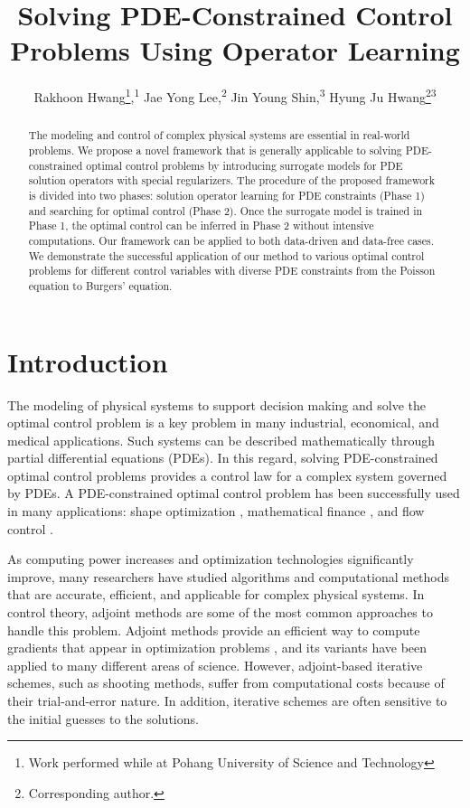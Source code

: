 \documentclass[letterpaper]{article}
\title{Solving PDE-Constrained Control Problems Using Operator Learning}
\author{
    Rakhoon Hwang\equalcontrib\thanks{Work performed while at Pohang University of Science and
Technology},\textsuperscript{\rm 1}
    Jae Yong Lee\equalcontrib\footnotemark[2],\textsuperscript{\rm 2}
    Jin Young Shin\equalcontrib,\textsuperscript{\rm 3}
    Hyung Ju Hwang\thanks{Corresponding author.}\textsuperscript{\rm 3}
}
\begin{document}
\maketitle

\begin{abstract}
The modeling and control of complex physical systems are essential in real-world problems. We propose a novel framework that is generally applicable to solving PDE-constrained optimal control problems by introducing surrogate models for PDE solution operators with special regularizers. The procedure of the proposed framework is divided into two phases: solution operator learning for PDE constraints (Phase 1) and searching for optimal control (Phase 2). Once the surrogate model is trained in Phase 1, the optimal control can be inferred in Phase 2 without intensive computations. Our framework can be applied to both data-driven and data-free cases. We demonstrate the successful application of our method to various optimal control problems for different control variables with diverse PDE constraints from the Poisson equation to Burgers' equation.
\end{abstract}

\section*{Introduction} \label{intro}
\noindent The modeling of physical systems to support decision making and solve the optimal control problem is a key problem in many industrial, economical, and medical applications. Such systems can be described mathematically through partial differential equations (PDEs). In this regard, solving PDE-constrained optimal control problems provides a control law for a complex system governed by PDEs. A PDE-constrained optimal control problem has been successfully used in many applications: shape optimization \cite{haslinger2003introduction,sokolowski1992introduction}, mathematical finance \cite{bouchouev1999uniqueness,egger2005tikhonov}, and flow control \cite{gunzburger2002perspectives}.

As computing power increases and optimization technologies significantly improve, many researchers have studied algorithms and computational methods that are accurate, efficient, and applicable for complex physical systems. In control theory, adjoint methods are some of the most common approaches to handle this problem. Adjoint methods provide an efficient way to compute gradients that appear in optimization problems \citep{lions1971optimal, pironneau1974optimum, troltzsch2010optimal}, and its variants have been applied to many different areas of science. However, adjoint-based iterative schemes, such as shooting methods, suffer from computational costs because of their trial-and-error nature. In addition, iterative schemes are often sensitive to the initial guesses to the solutions.
\end{document}
